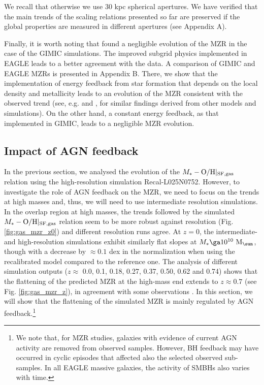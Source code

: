 \documentclass[useAMS,usenatbib]{mn2e}
\begin{document}
We recall that otherwise we use 30 kpc spherical apertures.
We have verified that the main trends of the scaling relations presented so far 
are preserved if the
global properties are measured in different apertures (see Appendix A).  

Finally, it is worth noting that \citet{derossi2015b} found a negligible evolution of the
MZR in the case of the {\sc GIMIC} simulations.  
The improved subgrid physics implemented in {\sc EAGLE} leads to a better agreement with the data. 
A comparison of {\sc GIMIC} and {\sc EAGLE} MZRs is presented in Appendix B.  
There, we show that the implementation of energy feedback from star formation
that depends on the local density and metallicity leads to an evolution of the MZR consistent
with the observed trend (see, e.g. \citealt{fu2012} and \citealt{dave2017}, for similar findings
derived from other models and simulations).  On the other hand, a constant energy feedback, as that implemented in {\sc GIMIC},
leads to a negligible MZR evolution.




\subsection{Impact of AGN feedback}
\label{sec:mzr_agns}

In the previous section, we analysed the evolution of the 
$M_* - {\rm O/H}|_{\rm SF,gas}$ relation using the high-resolution simulation
Recal-L025N0752.  However, to investigate the role of AGN feedback on the MZR,
we need to focus on the trends at high masses and, thus, we will need
to use intermediate resolution simulations.  
In the overlap region at high masses, the trends followed by the simulated $M_* - {\rm O/H}|_{\rm SF,gas}$ relation seem to be more 
robust against resolution (Fig. \ref{fig:gas_mzr_z0}) and different resolution runs agree.  
At $z = 0$, the intermediate- and high-resolution simulations
exhibit similarly flat slopes at $M_* \ga 10^{10} \ {\rm M}_{\sun}$, though with a decrease by $\approx 0.1$ dex in the normalization when using the recalibrated model compared to the reference one.  
The analysis of different simulation outputs 
($z\approx$ 0.0, 0.1, 0.18, 0.27, 0.37, 0.50, 0.62 and 0.74)
shows that the flattening of the
predicted MZR at the high-mass end extends to $z \approx 0.7$ (see Fig. \ref{fig:gas_mzr_z}),
in agreement with some observations \citep[e.g.][]{delosreyes2015}. In this section, we will
show that the flattening of the simulated MZR is mainly regulated 
by AGN feedback.\footnote{We note that, for MZR studies, galaxies with evidence of current AGN activity 
are removed from observed samples.  However, BH feedback may have occurred in cyclic episodes 
that affected also the selected observed sub-samples.
In all {\sc EAGLE} massive galaxies, the activity of SMBHs also varies with time.
}
\end{document}
